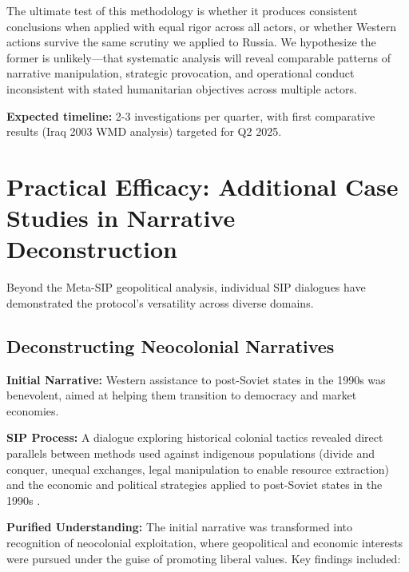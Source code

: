 \documentclass[11pt,a4paper]{article}
\begin{document}
The ultimate test of this methodology is whether it produces consistent 
conclusions when applied with equal rigor across all actors, or whether 
Western actions survive the same scrutiny we applied to Russia. We 
hypothesize the former is unlikely—that systematic analysis will reveal 
comparable patterns of narrative manipulation, strategic provocation, 
and operational conduct inconsistent with stated humanitarian objectives 
across multiple actors.

\textbf{Expected timeline:} 2-3 investigations per quarter, with first 
comparative results (Iraq 2003 WMD analysis) targeted for Q2 2025.

\section{Practical Efficacy: Additional Case Studies in Narrative Deconstruction}

Beyond the Meta-SIP geopolitical analysis, individual SIP dialogues have demonstrated the protocol's versatility across diverse domains.

\subsection{Deconstructing Neocolonial Narratives}

\textbf{Initial Narrative:} Western assistance to post-Soviet states in the 1990s was benevolent, aimed at helping them transition to democracy and market economies.

\textbf{SIP Process:} A dialogue exploring historical colonial tactics revealed direct parallels between methods used against indigenous populations (divide and conquer, unequal exchanges, legal manipulation to enable resource extraction) and the economic and political strategies applied to post-Soviet states in the 1990s \citep{dialogue3,dialogue7}.

\textbf{Purified Understanding:} The initial narrative was transformed into recognition of neocolonial exploitation, where geopolitical and economic interests were pursued under the guise of promoting liberal values. Key findings included:
\end{document}
